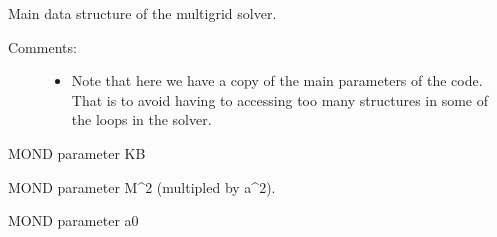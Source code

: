 \documentclass[letterpaper,10pt,english]{sphinxmanual}
\begin{document}

\begin{fulllineitems}
\label{\detokenize{data_structure:c.grids_gravity_mm}}%
\pysigstartmultiline
{}%
\pysigstopmultiline
Main data structure of the multigrid solver.
\begin{description}
\item[{Comments:}] \leavevmode\begin{itemize}
\item {} 
Note that here we have a copy of the main parameters of the code.
That is to avoid having to accessing too many structures in some of the
loops in the solver.

\end{itemize}

\end{description}

\begin{fulllineitems}
\label{\detokenize{data_structure:c.grids_gravity_mm.KB}}%
\pysigstartmultiline
{}%
\pysigstopmultiline
MOND parameter KB

\end{fulllineitems}


\begin{fulllineitems}
\label{\detokenize{data_structure:c.grids_gravity_mm.a2M2}}%
\pysigstartmultiline
{}%
\pysigstopmultiline
MOND parameter M\textasciicircum{}2 (multipled by a\textasciicircum{}2).

\end{fulllineitems}


\begin{fulllineitems}
\label{\detokenize{data_structure:c.grids_gravity_mm.aa0}}%
\pysigstartmultiline
{}%
\pysigstopmultiline
MOND parameter a0

\end{fulllineitems}


\end{fulllineitems}
\end{document}
